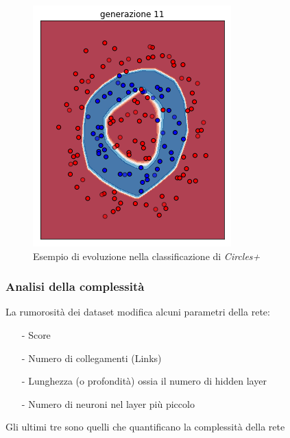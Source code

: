 \documentclass{beamer}
\begin{document}
\begin{frame}
\begin{figure}
  \includegraphics[scale = 0.25]{images/circle+-rnd-log./11.png}
  \caption{\large Esempio di evoluzione nella classificazione di \textit{Circles+}}
 \end{figure}   
\end{frame}

\begin{frame}
 \frametitle{Analisi della complessità}
 La rumorosità dei dataset modifica alcuni parametri della rete:
 \begin{enumerate}
  \item [-] Score
  \item [-] Numero di collegamenti (Links)
  \item [-] Lunghezza (o profondità) ossia il numero di hidden layer 
  \item [-] Numero di neuroni nel layer più piccolo
 \end{enumerate}
 Gli ultimi tre sono quelli che quantificano la complessità della rete 
\end{frame}
\end{document}
